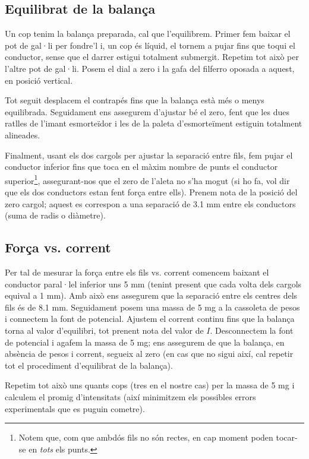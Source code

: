 \documentclass[a4paper,10.5pt]{report}
\begin{document}
\subsection{Equilibrat de la balança}
Un cop tenim la balança preparada, cal que l'equilibrem. Primer fem baixar el pot de gal·li per fondre'l i, un cop és líquid, el tornem a pujar fins que toqui el conductor, sense que el darrer estigui totalment submergit. Repetim tot això per l'altre pot de gal·li. Posem el dial a zero i la gafa del filferro oposada a aquest, en posició vertical.

Tot seguit desplacem el contrapés fins que la balança està més o menys equilibrada. Seguidament ens assegurem d'ajustar bé el zero, fent que les dues ratlles de l'imant esmorteïdor i les de la paleta d'esmorteïment estiguin totalment alineades.

Finalment, usant els dos cargols per ajustar la separació entre fils, fem pujar el conductor inferior fins que toca en el màxim nombre de punts el conductor superior\footnote{Notem que, com que ambdós fils no són rectes, en cap moment poden tocar-se en \textit{tots} els punts.}, assegurant-nos que el zero de l'aleta no s'ha mogut (si ho fa, vol dir que els dos conductors estan fent força entre ells). Prenem nota de la posició del zero cargol; aquest es correspon a una separació de 3.1 mm entre els conductors (suma de radis o diàmetre).

\subsection{Força vs. corrent}
Per tal de mesurar la força entre els fils vs. corrent comencem baixant el conductor paral·lel inferior uns 5 mm (tenint present que cada volta dels cargols equival a 1 mm). Amb això ens assegurem que la separació entre els centres dels fils és de 8.1 mm. Seguidament posem una massa de 5 mg a la cassoleta de pesos i connectem la font de potencial. Ajustem el corrent continu fins que la balança torna al valor d'equilibri, tot prenent nota del valor de $I$. Desconnectem la font de potencial i agafem la massa de 5 mg; ens assegurem de que la balança, en absència de pesos i corrent, segueix al zero (en cas que no sigui així, cal repetir tot el procediment d'equilibrat de la balança).

Repetim tot això uns quants cops (tres en el nostre cas) per la massa de 5 mg i calculem el promig d'intensitats (així minimitzem els possibles errors experimentals que es puguin cometre).
\end{document}
